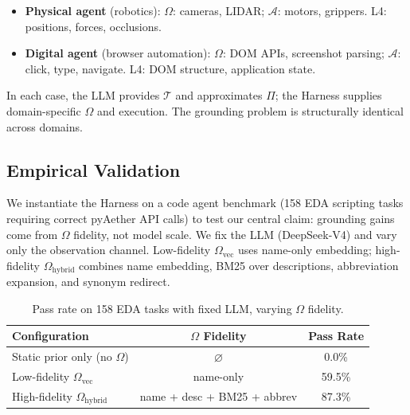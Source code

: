 \begin{itemize}
\item \textbf{Physical agent} (robotics): \(\Omega\): cameras, LIDAR; \(\mathcal{A}\): motors, grippers. L4: positions, forces, occlusions.

\item \textbf{Digital agent} (browser automation): \(\Omega\): DOM APIs, screenshot parsing; \(\mathcal{A}\): click, type, navigate. L4: DOM structure, application state.
\end{itemize}

In each case, the LLM provides \(\mathcal{T}\) and approximates \(\Pi\); the Harness supplies domain-specific \(\Omega\) and execution. The grounding problem is structurally identical across domains.

\subsection{Empirical Validation}

We instantiate the Harness on a code agent benchmark (158 EDA scripting tasks requiring correct pyAether API calls) to test our central claim: grounding gains come from \(\Omega\) fidelity, not model scale. We fix the LLM (DeepSeek-V4) and vary only the observation channel. Low-fidelity \(\Omega_{\text{vec}}\) uses name-only embedding; high-fidelity \(\Omega_{\text{hybrid}}\) combines name embedding, BM25 over descriptions, abbreviation expansion, and synonym redirect.

\begin{table}[t]
\centering
\caption{Pass rate on 158 EDA tasks with fixed LLM, varying \(\Omega\) fidelity.}
\label{tab:omega}
\begin{tabular}{lcc}
\toprule
Configuration & \(\Omega\) Fidelity & Pass Rate \\
\midrule
Static prior only (no \(\Omega\)) & \(\varnothing\) & 0.0\% \\
Low-fidelity \(\Omega_{\text{vec}}\) & name-only & 59.5\% \\
High-fidelity \(\Omega_{\text{hybrid}}\) & name + desc + BM25 + abbrev & 87.3\% \\
\bottomrule
\end{tabular}
\end{table}

